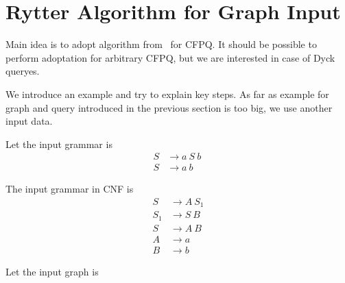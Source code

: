 \section {Rytter Algorithm for Graph Input} 

Main idea is to adopt algorithm from~\cite{Rytter} for CFPQ.
It should be possible to perform adoptation for arbitrary CFPQ, but we are interested in case of Dyck queryes.

We introduce an example and try to explain key steps.
As far as example for graph and query introduced in the previous section is too big, we use another input data.

Let the input grammar is 
\begin{align*}
S & \rightarrow a \ S \ b \ 
\\
S & \rightarrow a \ b
\end{align*}

The input grammar in CNF is 
\begin{align*}
S   & \rightarrow A \ S_1
\\
S_1 & \rightarrow S \ B
\\
S   & \rightarrow A \ B
\\
A   & \rightarrow a
\\
B   & \rightarrow b
\end{align*}


Let the input graph is
\\

  

